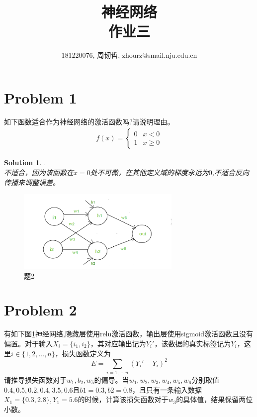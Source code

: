 \documentclass[a4paper,UTF8]{article}
\numberwithin{equation}{section}
\newtheorem*{solution}{Solution}
\begin{document}
\title{神经网络\\
作业三}
\author{181220076, 周韧哲, zhourz@smail.nju.edu.cn}
\maketitle

\section*{Problem 1}
如下函数适合作为神经网络的激活函数吗?请说明理由。\begin{align*}
	f(x)=\begin{cases}
		0& x<0 \\
		1 & x\geq0
	\end{cases}
\end{align*}
\begin{solution}.\\
	不适合，因为该函数在$x=0$处不可微，在其他定义域的梯度永远为$0$,不适合反向传播来调整误差。
\end{solution}

\begin{figure}
	\centering
	\includegraphics[width=0.7\textwidth]{pics/tmp.png}
	\caption{题2}
	\label{fig:1}
\end{figure}
\section*{Problem 2}
有如下图\ref{fig:1}神经网络,隐藏层使用relu激活函数，输出层使用sigmoid激活函数且没有偏置。对于输入$X_i=\{i_1,i_2\}$，其对应输出记为$Y_i′$，该数据的真实标签记为$Y_i$，这里$i\in\{1,2, ... , n\}$，损失函数定义为
$$E=\sum_{i=1,\cdots,n}(Y_i'-Y_i)^2$$
请推导损失函数对于$w_1,b_2,w_5$的偏导。当$w_1,w_2,w_3,w_4,w_5,w_6$分别取值$0.4,0.5,0.2,0.4,3.5,0.6$且$b1=0.3, b2=0.8$，且只有一条输入数据$X_1=\{ 0.3, 2.8\},Y_1=5.6$的时候，计算该损失函数对于$w_3$的具体值，结果保留两位小数。
\end{document}
